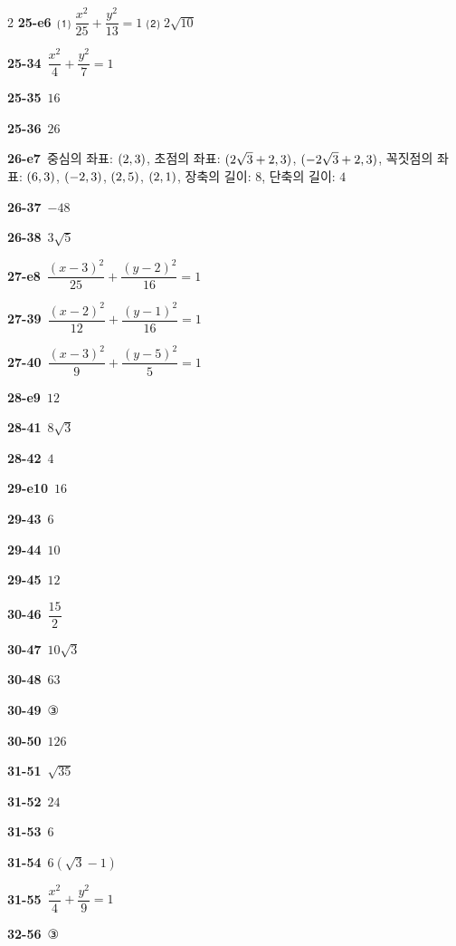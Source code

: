 \documentclass[10pt,a4paper]{article}
\begin{document}
\begin{multicols}{2}
\noindent\textbf{25-e6}\ ⑴ $\dfrac{x^2}{25}+\dfrac{y^2}{13}=1$ ⑵ $2\sqrt{10}$\par
\noindent\textbf{25-34}\ $\dfrac{x^2}{4}+\dfrac{y^2}{7}=1$\par
\noindent\textbf{25-35}\ $16$\par
\noindent\textbf{25-36}\ $26$\par
\noindent\textbf{26-e7}\ 중심의 좌표: $(2{,}\mkern3mu\mathopen{}3)$, 초점의 좌표: $(2\sqrt{3}+2{,}\mkern3mu\mathopen{}3)$, $(-2\sqrt{3}+2{,}\mkern3mu\mathopen{}3)$, 꼭짓점의 좌표: $(6{,}\mkern3mu\mathopen{}3)$, $(-2{,}\mkern3mu\mathopen{}3)$, $(2{,}\mkern3mu\mathopen{}5)$, $(2{,}\mkern3mu\mathopen{}1)$, 장축의 길이: $8$, 단축의 길이: $4$\par
\noindent\textbf{26-37}\ $-48$\par
\noindent\textbf{26-38}\ $3\sqrt{5}$\par
\noindent\textbf{27-e8}\ $\dfrac{(x-3)^2}{25}+\dfrac{(y-2)^2}{16}=1$\par
\noindent\textbf{27-39}\ $\dfrac{(x-2)^2}{12}+\dfrac{(y-1)^2}{16}=1$\par
\noindent\textbf{27-40}\ $\dfrac{(x-3)^2}{9}+\dfrac{(y-5)^2}{5}=1$\par
\noindent\textbf{28-e9}\ $12$\par
\noindent\textbf{28-41}\ $8\sqrt{3}$\par
\noindent\textbf{28-42}\ $4$\par
\noindent\textbf{29-e10}\ $16$\par
\noindent\textbf{29-43}\ $6$\par
\noindent\textbf{29-44}\ $10$\par
\noindent\textbf{29-45}\ $12$\par
\noindent\textbf{30-46}\ $\dfrac{15}{2}$\par
\noindent\textbf{30-47}\ $10\sqrt{3}$\par
\noindent\textbf{30-48}\ $63$\par
\noindent\textbf{30-49}\ ③\par
\noindent\textbf{30-50}\ $126$\par
\noindent\textbf{31-51}\ $\sqrt{35}$\par
\noindent\textbf{31-52}\ $24$\par
\noindent\textbf{31-53}\ $6$\par
\noindent\textbf{31-54}\ $6(\sqrt{3}-1)$\par
\noindent\textbf{31-55}\ $\dfrac{x^2}{4}+\dfrac{y^2}{9}=1$\par
\noindent\textbf{32-56}\ ③\par

\end{multicols}
\end{document}
